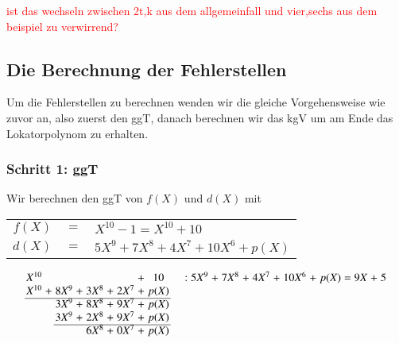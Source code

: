 \textcolor{red}{ist das wechseln zwischen 2t,k aus dem allgemeinfall und vier,sechs aus dem beispiel zu verwirrend?}

\subsection{Die Berechnung der Fehlerstellen
	\label{reedsolomon:subsection:nachrichtenvektor}}

Um die Fehlerstellen zu berechnen wenden wir die gleiche Vorgehensweise wie zuvor an, also zuerst den ggT, danach berechnen wir das kgV um am Ende das Lokatorpolynom zu erhalten.

\subsubsection{Schritt 1: ggT}

Wir berechnen den ggT von $f(X)$ und $d(X)$ mit
\begin{center}
\begin{tabular}{r c l}
	$f(X)$ & $=$ & $X^{10} - 1 = X^{10} + 10$ \\
	$d(X)$ & $=$ & $5X^9 + 7X^8 + 4X^7 + 10X^6 + p(X)$
\end{tabular}
\end{center} 
%
%
%
%
%
\[
\arraycolsep=1.4pt
\begin{array}{rcrcrcrcccrcrcrcrcrcrcrcrcr}
	X^{10}& & & & & & &+& 10& & & & &:&5X^9&+&7X^8&+& 4X^7&+&10X^6&+&p(X)&=&9X&+&5\\
	X^{10}&+& 8X^9&+& 3X^8&+&2X^7&+& p(X)& &  & & & &   & & & & & &   & &  & & \\ \cline{1-9}
	&& 3X^9&+& 8X^8&+& 9X^7&+& p(X)& &   & & & & & &   & &  & & \\
	&& 3X^9&+& 2X^8&+& 9X^7&+& p(X)& &   & & & & & &   & &  & & \\ \cline{3-9}
	& &    & &6X^8&+&0X^7&+&p(X)& &   & & & & & &   & &  & & \\
\end{array}
\]

